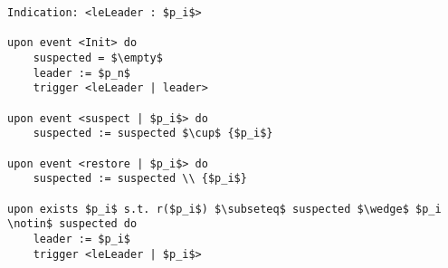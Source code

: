 \begin{lstlisting}[caption = eventually leader election, mathescape, captionpos=b]
Indication: <leLeader : $p_i$>

upon event <Init> do
    suspected = $\empty$
    leader := $p_n$
    trigger <leLeader | leader>

upon event <suspect | $p_i$> do
    suspected := suspected $\cup$ {$p_i$}

upon event <restore | $p_i$> do
    suspected := suspected \\ {$p_i$}

upon exists $p_i$ s.t. r($p_i$) $\subseteq$ suspected $\wedge$ $p_i \notin$ suspected do
    leader := $p_i$
    trigger <leLeader | $p_i$>
\end{lstlisting}
